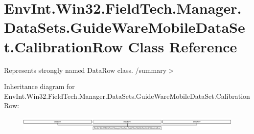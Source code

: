 \hypertarget{class_env_int_1_1_win32_1_1_field_tech_1_1_manager_1_1_data_sets_1_1_guide_ware_mobile_data_set_1_1_calibration_row}{}\section{Env\+Int.\+Win32.\+Field\+Tech.\+Manager.\+Data\+Sets.\+Guide\+Ware\+Mobile\+Data\+Set.\+Calibration\+Row Class Reference}
\label{class_env_int_1_1_win32_1_1_field_tech_1_1_manager_1_1_data_sets_1_1_guide_ware_mobile_data_set_1_1_calibration_row}


Represents strongly named Data\+Row class. /summary$>$  


Inheritance diagram for Env\+Int.\+Win32.\+Field\+Tech.\+Manager.\+Data\+Sets.\+Guide\+Ware\+Mobile\+Data\+Set.\+Calibration\+Row\+:\begin{figure}[H]
\begin{center}
\leavevmode
\includegraphics[height=0.745176cm]{class_env_int_1_1_win32_1_1_field_tech_1_1_manager_1_1_data_sets_1_1_guide_ware_mobile_data_set_1_1_calibration_row}
\end{center}
\end{figure}
